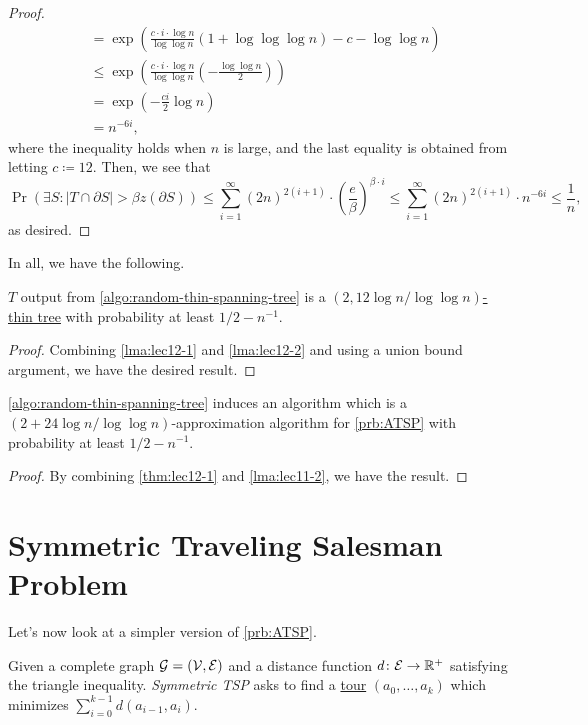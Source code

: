 \begin{proof}
\[\begin{split}
			&= \exp \left( \frac{c\cdot i\cdot \log n}{\log \log n}(1 + \log \log \log n) - c - \log \log n \right) \\
			&\leq \exp \left( \frac{c\cdot i\cdot \log n}{\log \log n} \left( - \frac{\log \log n}{2} \right) \right) \\
			&= \exp \left( - \frac{ci}{2}\log n \right) \\
			&= n^{-6i},
		\end{split}
	\]
	where the inequality holds when \(n\) is large, and the last equality is obtained from letting \(c \coloneqq 12\). Then, we see that
	\[
		\Pr(\exists S\colon \left\vert T \cap \partial S \right\vert > \beta z(\partial S))
		\leq \sum_{i=1}^{\infty} (2n)^{2(i+1)} \cdot \left( \frac{e}{\beta } \right) ^{\beta \cdot i}
		\leq \sum_{i=1}^{\infty} (2n)^{2(i+1)} \cdot n^{-6i} \leq \frac{1}{n},
	\]
	as desired.
\end{proof}

In all, we have the following.

\begin{theorem}\label{thm:lec12-1}
	\(T\) output from \autoref{algo:random-thin-spanning-tree} is a \hyperref[def:thin]{\((2, 12\log n / \log \log n)\)-thin tree} with probability at least \(1 / 2 - n^{-1} \).
\end{theorem}
\begin{proof}
	Combining \autoref{lma:lec12-1} and \autoref{lma:lec12-2} and using a union bound argument, we have the desired result.
\end{proof}

\begin{corollary}
	\autoref{algo:random-thin-spanning-tree} induces an algorithm which is a \((2 + 24\log n / \log \log n)\)-approximation algorithm for \autoref{prb:ATSP} with probability at least \(1 / 2 - n ^{-1} \).
\end{corollary}
\begin{proof}
	By combining \autoref{thm:lec12-1} and \autoref{lma:lec11-2}, we have the result.
\end{proof}


\section{Symmetric Traveling Salesman Problem}
Let's now look at a simpler version of \autoref{prb:ATSP}.

\begin{problem}\label{prb:STSP}
Given a complete graph \(\mathcal{\MakeUppercase{g}} =(\mathcal{\MakeUppercase{v}} , \mathcal{\MakeUppercase{e}} )\) and a distance function \(d\colon \mathcal{\MakeUppercase{e}} \to \mathbb{\MakeUppercase{r}} ^+\) satisfying the triangle inequality. \emph{Symmetric TSP} asks to find a \hyperref[def:tour]{tour} \((a_0, \ldots , a_k)\) which minimizes \(\sum_{i=0} ^{k-1}d(a_{i-1}, a_i)\).
\end{problem}

